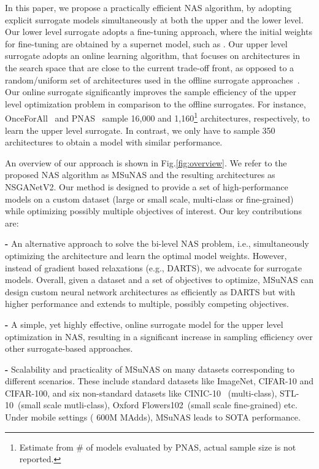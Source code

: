 \documentclass[runningheads]{llncs}
\def\ourmethod{MSuNAS}
\def\ourmodel{NSGANetV2}
\begin{document}
In this paper, we propose a practically efficient NAS algorithm, by adopting explicit surrogate models simultaneously at both the upper and the lower level. Our lower level surrogate adopts a fine-tuning approach, where the initial weights for fine-tuning are obtained by a supernet model, such as \cite{baker2017accelerating,smash,onceforall}. Our upper level surrogate adopts an online learning algorithm, that focuses on architectures in the search space that are close to the current trade-off front, as opposed to a random/uniform set of architectures used in the offline surrogate approaches~\cite{chamnet,dppnet,PNAS}. Our online surrogate significantly improves the sample efficiency of the upper level optimization problem in comparison to the offline surrogates. For instance, OnceForAll~\cite{onceforall} and PNAS~\cite{PNAS} sample 16,000 and 1,160\footnote{Estimate from \# of models evaluated by PNAS, actual sample size is not reported.} architectures, respectively, to learn the upper level surrogate. In contrast, we only have to sample 350 architectures to obtain a model with similar performance.

An overview of our approach is shown in Fig.\ref{fig:overview}. We refer to the proposed NAS algorithm as \ourmethod{} and the resulting architectures as \ourmodel{}. Our method is designed to provide a set of high-performance models on a custom dataset (large or small scale, multi-class or fine-grained) while optimizing possibly multiple objectives of interest. Our key contributions are:

\vspace{3pt}
\noindent\textbf{-} An alternative approach to solve the bi-level NAS problem, i.e., simultaneously optimizing the architecture and learn the optimal model weights. However, instead of gradient based relaxations (e.g., DARTS), we advocate for surrogate models. Overall, given a dataset and a set of objectives to optimize, \ourmethod{} can design custom neural network architectures as efficiently as DARTS but with higher performance and extends to multiple, possibly competing objectives.

\vspace{3pt}
\noindent\textbf{-} A simple, yet highly effective, online surrogate model for the upper level optimization in NAS, resulting in a significant increase in sampling efficiency over other surrogate-based approaches.

\vspace{3pt}
\noindent\textbf{-} Scalability and practicality of \ourmethod{} on many datasets corresponding to different scenarios. These include standard datasets like ImageNet, CIFAR-10 and CIFAR-100, and six non-standard datasets like CINIC-10~\cite{cinic10} (multi-class), STL-10~\cite{stl-10}(small scale mutli-class), Oxford Flowers102~\cite{flowers102}(small scale fine-grained) etc. Under mobile settings ( 600M MAdds), \ourmethod{} leads to SOTA performance.
\end{document}

